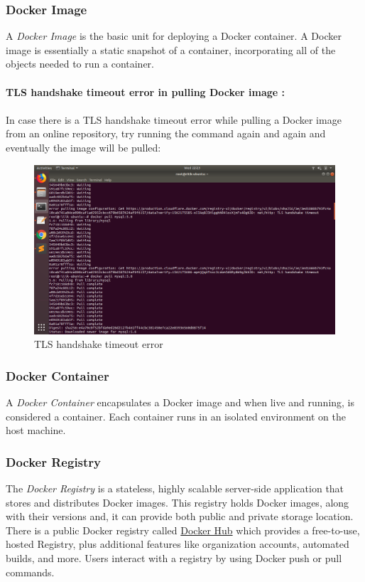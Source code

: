 \documentclass[12pt]{report}
\begin{document}
\subsubsection{Docker Image}
A \textit{Docker Image} is the basic unit for deploying a Docker container. A Docker image is essentially a static snapshot of a container, incorporating all of the objects needed to run a container.\\\\
\textbf{TLS handshake timeout error in pulling Docker image :}\\\\
In case there is a TLS handshake timeout error while pulling a Docker image from an online repository, try running the command again and again and eventually the image will be pulled:
\begin{figure}[h!]
	\begin{center}
		\includegraphics[totalheight=0.4\textheight]{TLS}
		\caption{TLS handshake timeout error}
	\end{center}
\end{figure} 
\subsubsection{Docker Container}
A \textit{Docker Container} encapsulates a Docker image and when live and running, is considered a container. Each container runs in an isolated environment on the host machine.
\subsubsection{Docker Registry}
The \textit{Docker Registry} is a stateless, highly scalable server-side application that stores and distributes Docker images. This registry holds Docker images, along with their versions and, it can provide both public and private storage location. There is a public Docker registry called \href{https://hub.docker.com/}{Docker Hub} which provides a free-to-use, hosted Registry, plus additional features like organization accounts, automated builds, and more. Users interact with a registry by using Docker push or pull commands.
\end{document}
